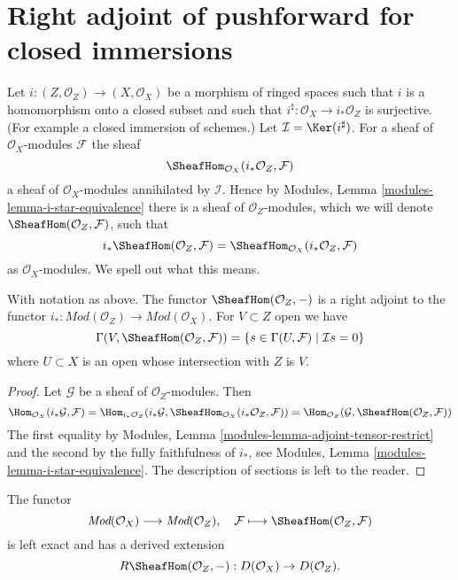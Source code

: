 \section{Right adjoint of pushforward for closed immersions}
\label{section-sections-with-exact-support}

\noindent
Let $i : (Z, \mathcal{O}_Z) \to (X, \mathcal{O}_X)$ be a morphism
of ringed spaces such that $i$ is a homomorphism onto a closed
subset and such that $i^\sharp : \mathcal{O}_X \to i_*\mathcal{O}_Z$
is surjective. (For example a closed immersion of schemes.)
Let $\mathcal{I} = \Ker(i^\sharp)$. For a sheaf
of $\mathcal{O}_X$-modules $\mathcal{F}$ the sheaf
$$
\SheafHom_{\mathcal{O}_X}(i_*\mathcal{O}_Z, \mathcal{F})
$$
a sheaf of $\mathcal{O}_X$-modules annihilated by $\mathcal{I}$.
Hence by Modules, Lemma \ref{modules-lemma-i-star-equivalence}
there is a sheaf of $\mathcal{O}_Z$-modules,
which we will denote $\SheafHom(\mathcal{O}_Z, \mathcal{F})$,
such that
$$
i_*\SheafHom(\mathcal{O}_Z, \mathcal{F}) =
\SheafHom_{\mathcal{O}_X}(i_*\mathcal{O}_Z, \mathcal{F})
$$
as $\mathcal{O}_X$-modules. We spell out what this means.

\begin{lemma}
\label{lemma-compute-sheaf-with-exact-support}
With notation as above. The functor $\SheafHom(\mathcal{O}_Z, -)$ is a
right adjoint to the functor
$i_* : \textit{Mod}(\mathcal{O}_Z) \to \textit{Mod}(\mathcal{O}_X)$.
For $V \subset Z$ open we have
$$
\Gamma(V, \SheafHom(\mathcal{O}_Z, \mathcal{F})) =
\{s \in \Gamma(U, \mathcal{F}) \mid \mathcal{I}s = 0\}
$$
where $U \subset X$ is an open whose intersection with $Z$ is $V$.
\end{lemma}

\begin{proof}
Let $\mathcal{G}$ be a sheaf of $\mathcal{O}_Z$-modules. Then
$$
\Hom_{\mathcal{O}_X}(i_*\mathcal{G}, \mathcal{F}) =
\Hom_{i_*\mathcal{O}_Z}(i_*\mathcal{G},
\SheafHom_{\mathcal{O}_X}(i_*\mathcal{O}_Z, \mathcal{F})) =
\Hom_{\mathcal{O}_Z}(\mathcal{G}, \SheafHom(\mathcal{O}_Z, \mathcal{F}))
$$
The first equality by
Modules, Lemma \ref{modules-lemma-adjoint-tensor-restrict}
and the second by the fully faithfulness of $i_*$, see
Modules, Lemma \ref{modules-lemma-i-star-equivalence}.
The description of sections is left to the reader.
\end{proof}

\noindent
The functor
$$
\textit{Mod}(\mathcal{O}_X)
\longrightarrow
\textit{Mod}(\mathcal{O}_Z),
\quad
\mathcal{F} \longmapsto \SheafHom(\mathcal{O}_Z, \mathcal{F})
$$
is left exact and has a derived extension
$$
R\SheafHom(\mathcal{O}_Z, -) : D(\mathcal{O}_X) \to D(\mathcal{O}_Z).
$$


